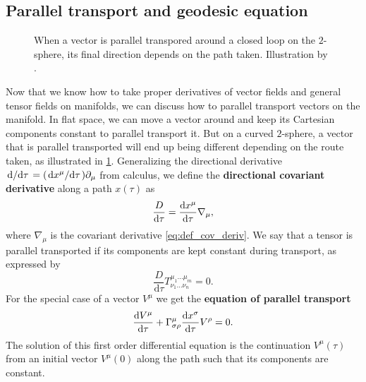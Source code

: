 
\iffalse
\begin{align}
	\nabla_c T\indices{^{a_1 \ldots a_r}_{b_1 \ldots b_s}} &= \partial_c {T^{a_1 \ldots a_r}}_{b_1 \ldots b_s} \\
	                                                       &+ \Gamma^{a_1}_{dc} T\indices{^{d a_2 \ldots a_r}_{b_1 \ldots b_s}} + \dots + \Gamma^{a_r}_{dc} T\indices{^{a_1 \ldots a_{r-1}d}_{b_1 \ldots b_s}} \\
	                                                       &- {\Gamma^d}_{b_1 c} {T^{a_1 \ldots a_r}}_{d b_2 \ldots b_s} - \cdots - {\Gamma^d}_{b_s c} {T^{a_1 \ldots a_r}}_{b_1 \ldots b_{s-1} d}.
	\label{eq:def_cov_deriv}
\end{align}
\fi

\subsection{Parallel transport and geodesic equation}
\label{sec:geodesic}

\begin{figure}
\centering

\caption{\label{fig:parallel_transport}When a vector is parallel transpored around a closed loop on the $2$-sphere, its final direction depends on the path taken. Illustration by \cite{ref:figure_parallel_transport}.}
\end{figure}

Now that we know how to take proper derivatives of vector fields and general tensor fields on manifolds, we can discuss how to parallel transport vectors on the manifold.
In flat space, we can move a vector around and keep its Cartesian components constant to parallel transport it.
But on a curved $2$-sphere, a vector that is parallel transported will end up being different depending on the route taken, as illustrated in \cref{fig:parallel_transport}.
Generalizing the directional derivative $\odv{}/{\tau} = (\odv{x^\mu}/{\tau}) \partial_\mu$ from calculus, we define the \textbf{directional covariant derivative} along a path $x(\tau)$ as
\begin{equation}
	\frac{D}{\mathrm{d} \tau} = \odv{x^\mu}{\tau} \nabla_\mu,
\end{equation}
where $\nabla_\mu$ is the covariant derivative \eqref{eq:def_cov_deriv}.
We say that a tensor is parallel transported if its components are kept constant during transport, as expressed by
\begin{equation}
	\frac{D}{\mathrm{d} \tau} T^{\mu_1 \ldots \mu_m}_{\nu_1 \ldots \nu_n} = 0 .
\end{equation}
For the special case of a vector $V^\mu$ we get the \textbf{equation of parallel transport}
\begin{equation}
	\odv{V^\mu}{\tau} + \Gamma^{\mu}_{\sigma \rho} \odv{x^\sigma}{\tau} V^\rho = 0 .
	\label{eq:parallel_transport}
\end{equation}
The solution of this first order differential equation is the continuation $V^\mu(\tau)$ from an initial vector $V^\mu(0)$ along the path such that its components are constant.

